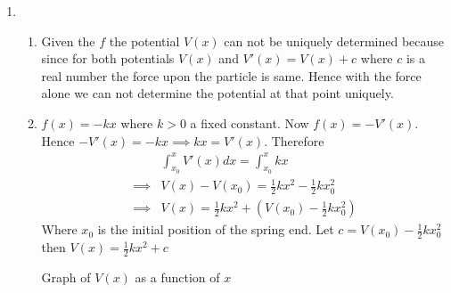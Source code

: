 \documentclass{article}
\begin{document}
\begin{enumerate}
		
		\item \begin{enumerate}
			\item Given the $f$ the potential $V(x)$ can not be uniquely determined because since for both potentials $V(x)$ and $V'(x)=V(x)+c$ where $c$ is a real number the force upon the particle is same. Hence with the force alone we can not determine the potential at that point uniquely.
	\item $f(x)=-kx$ where $k>0$ a fixed constant. Now $f(x)=-V'(x)$. Hence $-V'(x)=-kx\implies kx=V'(x)$. Therefore\begin{align*}
		&\int_{x_0}^x V'(x)dx=\int_{x_0}^x kx\\
		\implies & V(x)-V(x_0)=\frac12kx^2-\frac12kx_0^2\\
		\implies & V(x)=\frac12kx^2+\left( V(x_0)-\frac12kx_0^2\right) 
	\end{align*}Where $x_0$ is the initial position of the spring end. Let $c= V(x_0)-\frac12kx_0^2$ then $V(x)=\frac12kx^2+c$
\begin{center}
	

Graph of $V(x)$ as a function of $x$

\end{center}


\end{enumerate}
\end{enumerate}
\end{document}
